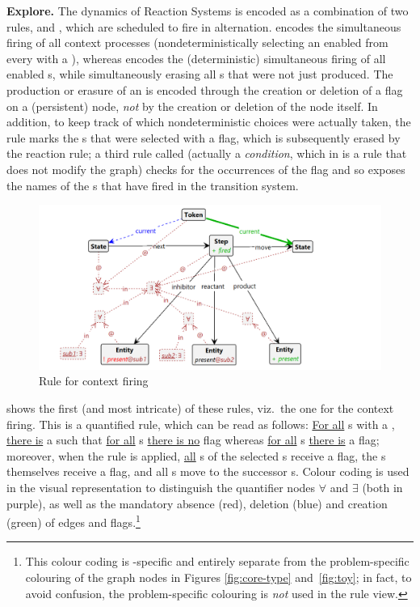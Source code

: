 \medskip\noindent\textbf{Explore.}
%
The dynamics of Reaction Systems is encoded as a combination of two rules, \contextR and \reactR, which are scheduled to fire in alternation. \contextR encodes the simultaneous firing of all context processes (nondeterministically selecting an enabled \Step from every \State with a \Token), whereas \reactR encodes the (deterministic) simultaneous firing of all enabled \Reaction{}s, while simultaneously erasing all \Entity{}s that were not just produced. The production or erasure of an \Entity is encoded through the creation or deletion of a \present flag on a (persistent) \Entity node, \emph{not} by the creation or deletion of the node itself. In addition, to keep track of which nondeterministic choices were actually taken, the \contextR rule marks the \Step{}s that were selected with a \fired flag, which is subsequently erased by the reaction rule; a third rule called \firedR (actually a \emph{condition}, which in \GROOVE is a rule that does not modify the graph) checks for the occurrences of the \fired flag and so exposes the names of the \Rule{}s that have fired in the transition system.

\begin{figure}
\centering
\includegraphics[scale=.2]{figs/context}
\caption{Rule for context firing}
\label{fig:context}
\end{figure}
%
 shows the first (and most intricate) of these rules, viz.\ the one for the context firing. This is a quantified rule, which can be read as follows: \uline{For all} \State{}s with a \Token, \uline{there is} a \nextt{} \Step such that \uline{for all} \inhibitor{}s \uline{there is no} \present flag whereas \uline{for all} \reactant{}s \uline{there is} a \present flag; moreover, when the rule is applied, \uline{all} \product{}s of the selected \Step{}s receive a \present flag, the \Step{}s themselves receive a \fired flag, and all \Token{}s move to the successor \State{}s. Colour coding is used in the visual representation to distinguish the quantifier nodes $\forall$ and $\exists$ (both in purple), as well as the mandatory absence (red), deletion (blue) and creation (green) of edges and flags.\footnote{This colour coding is \GROOVE-specific and entirely separate from the problem-specific colouring of the graph nodes in Figures \ref{fig:core-type} and~\ref{fig:toy}; in fact, to avoid confusion, the problem-specific colouring is \emph{not} used in the rule view.}

